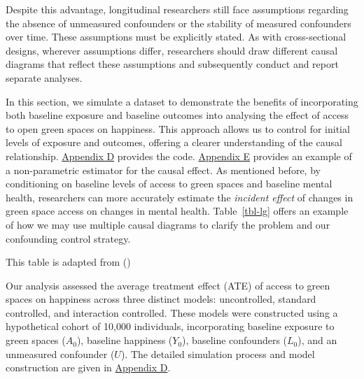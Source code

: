\documentclass[
  single column]{article}
\begin{document}
Despite this advantage, longitudinal researchers still face assumptions
regarding the absence of unmeasured confounders or the stability of
measured confounders over time. These assumptions must be explicitly
stated. As with cross-sectional designs, wherever assumptions differ,
researchers should draw different causal diagrams that reflect these
assumptions and subsequently conduct and report separate analyses.

In this section, we simulate a dataset to demonstrate the benefits of
incorporating both baseline exposure and baseline outcomes into
analysing the effect of access to open green spaces on happiness. This
approach allows us to control for initial levels of exposure and
outcomes, offering a clearer understanding of the causal relationship.
\hyperref[appendix-d-simulation-of-different-confounding-control-strategies]{Appendix
D} provides the code.
\hyperref[appendix-e-non-parametric-estimation-of-average-treatment-effects-using-causal-forests]{Appendix
E} provides an example of a non-parametric estimator for the causal
effect. As mentioned before, by conditioning on baseline levels of
access to green spaces and baseline mental health, researchers can more
accurately estimate the \emph{incident effect} of changes in green space
access on changes in mental health. Table~\ref{tbl-lg} offers an example
of how we may use multiple causal diagrams to clarify the problem and
our confounding control strategy.

\begin{table}

\caption{\label{tbl-lg}This table is adapted from
()}

\centering{

\examplelongitudinal

}

\end{table}%

Our analysis assessed the average treatment effect (ATE) of access to
green spaces on happiness across three distinct models: uncontrolled,
standard controlled, and interaction controlled. These models were
constructed using a hypothetical cohort of 10,000 individuals,
incorporating baseline exposure to green spaces (\(A_0\)), baseline
happiness (\(Y_0\)), baseline confounders (\(L_0\)), and an unmeasured
confounder (\(U\)). The detailed simulation process and model
construction are given in
\hyperref[appendix-simulate-longitudinal-ate]{Appendix D}.
\end{document}
